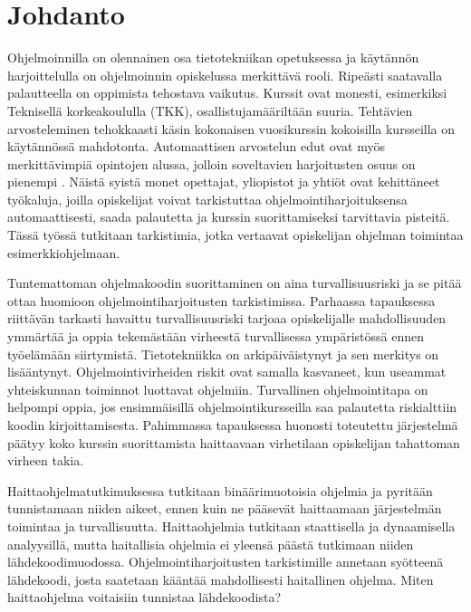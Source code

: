 

\section{Johdanto}
\label{sec:johd}

Ohjelmoinnilla on olennainen osa tietotekniikan opetuksessa ja käytännön
harjoittelulla on ohjelmoinnin opiskelussa merkittävä rooli. Ripeästi saatavalla
palautteella on oppimista tehostava vaikutus. Kurssit ovat monesti, esimerkiksi
Teknisellä korkeakoululla (TKK), osallistujamääriltään suuria. Tehtävien
arvosteleminen tehokkaasti käsin kokonaisen vuosikurssin kokoisilla kursseilla
on käytännössä mahdotonta. Automaattisen arvostelun edut ovat myös
merkittävimpiä opintojen alussa, jolloin soveltavien harjoitusten osuus on
pienempi \citep{carter2003shall}. Näistä syistä monet opettajat, yliopistot ja
yhtiöt ovat kehittäneet työkaluja, joilla opiskelijat voivat tarkistuttaa
ohjelmointiharjoituksensa automaattisesti, saada palautetta ja kurssin
suorittamiseksi tarvittavia pisteitä. Tässä työssä tutkitaan tarkistimia,
jotka vertaavat opiskelijan ohjelman toimintaa esimerkkiohjelmaan.

Tuntemattoman ohjelmakoodin suorittaminen on aina turvallisuusriski ja se
pitää ottaa huomioon ohjelmointiharjoitusten tarkistimissa. Parhaassa
tapauksessa riittävän tarkasti havaittu turvallisuusriski tarjoaa
opiskelijalle mahdollisuuden ymmärtää ja oppia tekemästään virheestä
turvallisessa ympäristössä ennen työelämään siirtymistä. Tietotekniikka on
arkipäiväistynyt ja sen merkitys on lisääntynyt. Ohjelmointivirheiden riskit
ovat samalla kasvaneet, kun useammat yhteiskunnan toiminnot luottavat ohjelmiin.
Turvallinen ohjelmointitapa on helpompi oppia, jos ensimmäisillä
ohjelmointikursseilla saa palautetta riskialttiin koodin kirjoittamisesta.
Pahimmassa tapauksessa huonosti toteutettu järjestelmä päätyy koko kurssin
suorittamista haittaavaan virhetilaan opiskelijan tahattoman virheen takia.

Haittaohjelmatutkimuksessa tutkitaan binäärimuotoisia ohjelmia ja pyritään
tunnistamaan niiden aikeet, ennen kuin ne pääsevät haittaamaan järjestelmän
toimintaa ja turvallisuutta. Haittaohjelmia tutkitaan staattisella ja
dynaamisella analyysillä, mutta haitallisia ohjelmia ei yleensä päästä
tutkimaan niiden lähdekoodimuodossa. Ohjelmointiharjoitusten tarkistimille
annetaan syötteenä lähdekoodi, josta saatetaan kääntää mahdollisesti
haitallinen ohjelma. Miten haittaohjelma voitaisiin tunnistaa lähdekoodista?

